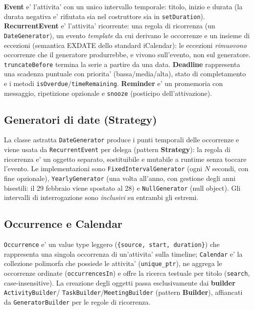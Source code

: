 \documentclass[10pt,a4paper]{article}
\begin{document}
\textbf{Event} e' l'attivita' con un unico intervallo temporale: titolo, inizio
e durata (la durata negativa e' rifiutata sia nel costruttore sia in
\texttt{setDuration}). \textbf{RecurrentEvent} e' l'attivita' ricorrente: una
regola di ricorrenza (un \texttt{DateGenerator}), un evento \emph{template} da
cui derivano le occorrenze e un insieme di eccezioni (semantica EXDATE
dello standard iCalendar): le eccezioni \emph{rimuovono} occorrenze che il
generatore produrrebbe, e vivono sull'evento, non sul generatore.
\texttt{truncateBefore} termina la serie a partire da una data. \textbf{Deadline}
rappresenta una scadenza puntuale con priorita' (bassa/media/alta), stato di
completamento e i metodi \texttt{isOverdue}/\texttt{timeRemaining}.
\textbf{Reminder} e' un promemoria con messaggio, ripetizione opzionale e
\texttt{snooze} (posticipo dell'attivazione).

\subsection{Generatori di date (Strategy)}

La classe astratta \texttt{DateGenerator} produce i punti temporali delle
occorrenze e viene usata da \texttt{RecurrentEvent} per delega (pattern
\textbf{Strategy}): la regola di ricorrenza e' un oggetto separato, sostituibile
e mutabile a runtime senza toccare l'evento. Le implementazioni sono
\texttt{FixedIntervalGenerator} (ogni $N$ secondi, con fine opzionale),
\texttt{YearlyGenerator} (una volta all'anno, con gestione degli anni bisestili:
il 29 febbraio viene spostato al 28) e \texttt{NullGenerator} (null object).
Gli intervalli di interrogazione sono \emph{inclusivi} su entrambi gli estremi.

\subsection{Occurrence e Calendar}

\texttt{Occurrence} e' un value type leggero
(\texttt{\{source, start, duration\}}) che rappresenta una singola occorrenza
di un'attivita' sulla timeline; \texttt{Calendar} e' la collezione polimorfa
che possiede le attivita' (\texttt{unique\_ptr}), ne aggrega le occorrenze
ordinate (\texttt{occurrencesIn}) e offre la ricerca testuale per titolo
(\texttt{search}, case-insensitive). La creazione degli oggetti passa
esclusivamente dai \textbf{builder} \texttt{ActivityBuilder}/
\texttt{TaskBuilder}/\texttt{MeetingBuilder} (pattern \textbf{Builder}),
affiancati da \texttt{GeneratorBuilder} per le regole di ricorrenza.
\end{document}
